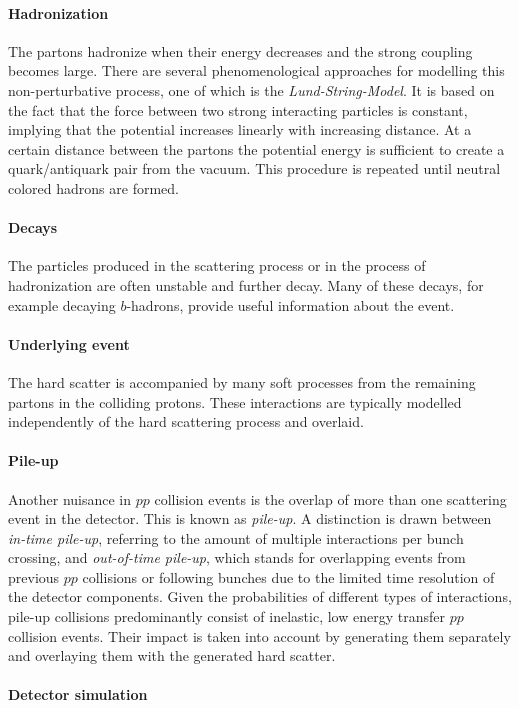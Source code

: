 \paragraph{Hadronization}
The partons hadronize when their energy decreases and the strong coupling becomes large. There are several phenomenological approaches for modelling this non-perturbative process, one of which is the \emph{Lund-String-Model}. 
It is based on the fact that the force between two strong interacting particles is constant, implying that the potential increases linearly with increasing distance.
At a certain distance between the partons the potential energy is sufficient to create a quark/antiquark pair from the vacuum. This procedure is repeated until neutral colored hadrons are formed.
\paragraph{Decays}
The particles produced in the scattering process or in the process of hadronization are often unstable and further decay. Many of these decays, for example decaying $b$-hadrons, provide useful information about the event. %
\paragraph{Underlying event}
The hard scatter is accompanied by many soft processes from the remaining partons in the colliding protons. 
These interactions are typically modelled independently of the hard scattering process and overlaid.
\paragraph{Pile-up}
Another nuisance in $pp$ collision events is the overlap of more than one scattering event in the detector. This is known as \emph{pile-up}. A distinction is drawn between \emph{in-time pile-up}, referring to the amount of multiple interactions per bunch crossing, and \emph{out-of-time pile-up}, which stands for overlapping events from previous $pp$ collisions or following bunches due to the limited time resolution of the detector components.
Given the probabilities of different types of interactions, pile-up collisions predominantly consist of inelastic, low energy transfer $pp$ collision events. 
Their impact is taken into account by generating them separately and overlaying them with the generated hard scatter.
\paragraph{Detector simulation}

